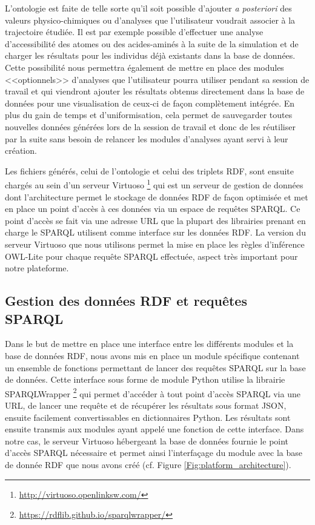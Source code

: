 L'ontologie est faite de telle sorte qu'il soit possible d'ajouter \textit{a posteriori} des valeurs physico-chimiques ou d'analyses que l'utilisateur voudrait associer à la trajectoire étudiée. Il est par exemple possible d'effectuer une analyse d'accessibilité des atomes ou des acides-aminés à la suite de la simulation et de charger les résultats pour les individus déjà existants dans la base de données. Cette possibilité nous permettra également de mettre en place des modules <<optionnels>> d'analyses que l'utilisateur pourra utiliser pendant sa session de travail et qui viendront ajouter les résultats obtenus directement dans la base de données pour une visualisation de ceux-ci de façon complètement intégrée. En plus du gain de temps et d'uniformisation, cela permet de sauvegarder toutes nouvelles données générées lors de la session de travail et donc de les réutiliser par la suite sans besoin de relancer les modules d'analyses ayant servi à leur création.

Les fichiers générés, celui de l'ontologie et celui des triplets RDF, sont ensuite chargés au sein d'un serveur Virtuoso \footnote{\url{http://virtuoso.openlinksw.com/}} qui est un serveur de gestion de données dont l'architecture permet le stockage de données RDF de façon optimisée et met en place un point d'accès à ces données via un espace de requêtes SPARQL. Ce point d'accès se fait via une adresse URL que la plupart des librairies prenant en charge le SPARQL utilisent comme interface sur les données RDF. La version du serveur Virtuoso que nous utilisons permet la mise en place les règles d'inférence OWL-Lite pour chaque requête SPARQL effectuée, aspect très important pour notre plateforme.

\subsection{Gestion des données RDF et requêtes SPARQL}

Dans le but de mettre en place une interface entre les différents modules et la base de données RDF, nous avons mis en place un module spécifique contenant un ensemble de fonctions permettant de lancer des requêtes SPARQL sur la base de données. 
Cette interface sous forme de module Python utilise la librairie SPARQLWrapper \footnote{\url{https://rdflib.github.io/sparqlwrapper/}} qui permet d'accéder à tout point d'accès SPARQL via une URL, de lancer une requête et de récupérer les résultats sous format JSON, ensuite facilement convertissables en dictionnaires Python. Les résultats sont ensuite transmis aux modules ayant appelé une fonction de cette interface. Dans notre cas, le serveur Virtuoso hébergeant la base de données fournie le point d'accès SPARQL nécessaire et permet ainsi l'interfaçage du module avec la base de donnée RDF que nous avons créé (cf. Figure \ref{Fig:platform_architecture}).

